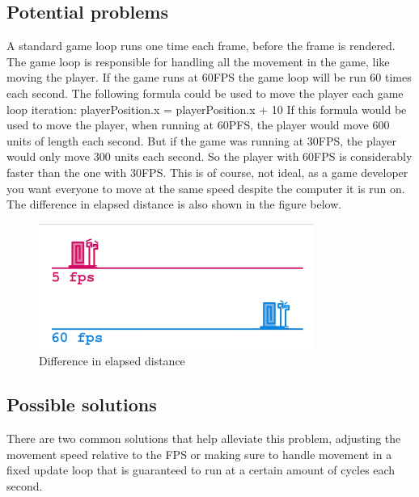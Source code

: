 \documentclass{article} %
\begin{document}
\subsection{Potential problems}
A standard game loop runs one time each frame, before the frame is rendered.
The game loop is responsible for handling all the movement in the game, like moving the player.
If the game runs at 60FPS the game loop will be run 60 times each second.
\newline\newline
The following formula could be used to move the player each game loop iteration:
\newline
playerPosition.x = playerPosition.x + 10
\newline\newline
If this formula would be used to move the player, when running at 60PFS, the player would move 600 units of length each second.
But if the game was running at 30FPS, the player would only move 300 units each second.
So the player with 60FPS is considerably faster than the one with 30FPS.
This is of course, not ideal, as a game developer you want everyone to move at the same speed despite the computer it is run on.
The difference in elapsed distance is also shown in the figure below.
\begin{figure}[h!]
    \centering
    \includegraphics[width=0.8\textwidth]{difference_in_distance.png}
    \caption{Difference in elapsed distance}
\end{figure}

\subsection{Possible solutions}
There are two common solutions that help alleviate this problem, adjusting the movement speed relative to the FPS or making sure to handle movement in a fixed update loop that is guaranteed to run at a certain amount of cycles each second.
\end{document}
